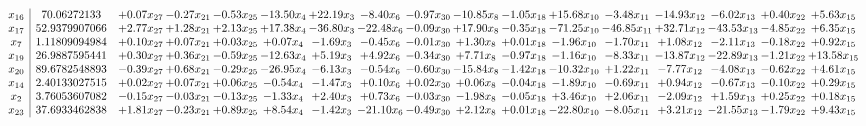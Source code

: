 \documentclass[9pt]{article}
\begin{document}
 \[\begin{array}{c| c c@{\hskip 2pt} c@{\hskip 2pt} c@{\hskip 2pt} c@{\hskip 2pt} c@{\hskip 2pt} c@{\hskip 2pt} c@{\hskip 2pt} c@{\hskip 2pt} c@{\hskip 2pt} c@{\hskip 2pt} c@{\hskip 2pt} c@{\hskip 2pt} c@{\hskip 2pt} c@{\hskip 2pt} c@{\hskip 2pt} }
 x_{16}   &  70.06272133 & +  0.07 x_{27} & -0.27 x_{21} & -0.53 x_{25} & -13.50 x_{4} & + 22.19 x_{3} & -8.40 x_{6} & -0.97 x_{30} & -10.85 x_{8} & -1.05 x_{18} & + 15.68 x_{10} & -3.48 x_{11} & -14.93 x_{12} & -6.02 x_{13} & +  0.40 x_{22} & +  5.63 x_{15}\\
 x_{17}   &  52.9379907066 & +  2.77 x_{27} & +  1.28 x_{21} & +  2.13 x_{25} & + 17.38 x_{4} & -36.80 x_{3} & -22.48 x_{6} & -0.09 x_{30} & + 17.90 x_{8} & -0.35 x_{18} & -71.25 x_{10} & -46.85 x_{11} & + 32.71 x_{12} & -43.53 x_{13} & -4.85 x_{22} & +  6.35 x_{15}\\
 x_{7}   &  1.11809094984 & +  0.10 x_{27} & +  0.07 x_{21} & +  0.03 x_{25} & +  0.07 x_{4} & -1.69 x_{3} & -0.45 x_{6} & -0.01 x_{30} & +  1.30 x_{8} & +  0.01 x_{18} & -1.96 x_{10} & -1.70 x_{11} & +  1.08 x_{12} & -2.11 x_{13} & -0.18 x_{22} & +  0.92 x_{15}\\
 x_{19}   &  26.9887595441 & +  0.30 x_{27} & +  0.36 x_{21} & -0.59 x_{25} & -12.63 x_{4} & +  5.19 x_{3} & +  4.92 x_{6} & -0.34 x_{30} & +  7.71 x_{8} & -0.97 x_{18} & -1.16 x_{10} & -8.33 x_{11} & -13.87 x_{12} & -22.89 x_{13} & -1.21 x_{22} & + 13.58 x_{15}\\
 x_{20}   &  89.6782548893 & -0.39 x_{27} & +  0.68 x_{21} & -0.29 x_{25} & -26.95 x_{4} & -6.13 x_{3} & -0.54 x_{6} & -0.60 x_{30} & -15.84 x_{8} & -1.42 x_{18} & -10.32 x_{10} & +  1.22 x_{11} & -7.77 x_{12} & -4.08 x_{13} & -0.62 x_{22} & +  4.61 x_{15}\\
 x_{14}   &  2.40133027515 & +  0.02 x_{27} & +  0.07 x_{21} & +  0.06 x_{25} & -0.54 x_{4} & -1.47 x_{3} & +  0.10 x_{6} & +  0.02 x_{30} & +  0.06 x_{8} & -0.04 x_{18} & -1.89 x_{10} & -0.69 x_{11} & +  0.94 x_{12} & -0.67 x_{13} & -0.10 x_{22} & +  0.29 x_{15}\\
 x_{2}   &  3.76053607082 & -0.15 x_{27} & -0.03 x_{21} & -0.13 x_{25} & -1.33 x_{4} & +  2.40 x_{3} & +  0.73 x_{6} & -0.03 x_{30} & -1.98 x_{8} & -0.05 x_{18} & +  3.46 x_{10} & +  2.06 x_{11} & -2.09 x_{12} & +  1.59 x_{13} & +  0.25 x_{22} & +  0.18 x_{15}\\
 x_{23}   &  37.6933462838 & +  1.81 x_{27} & -0.23 x_{21} & +  0.89 x_{25} & +  8.54 x_{4} & -1.42 x_{3} & -21.10 x_{6} & -0.49 x_{30} & +  2.12 x_{8} & +  0.01 x_{18} & -22.80 x_{10} & -8.05 x_{11} & +  3.21 x_{12} & -21.55 x_{13} & -1.79 x_{22} & +  9.43 x_{15}\\

\end{array}\]
\end{document}

